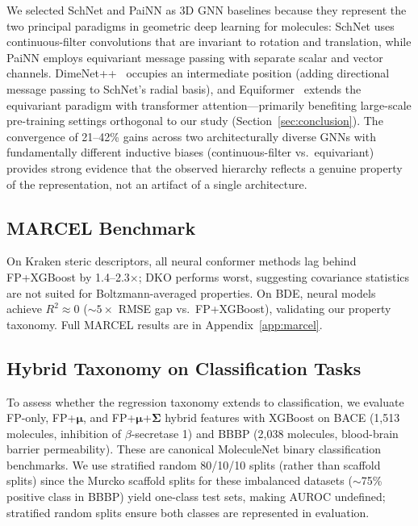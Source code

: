 \documentclass[sigconf]{acmart}
\newcommand{\rev}[1]{#1}
\begin{document}
\rev{We selected SchNet and PaiNN as 3D GNN baselines because they represent the two principal paradigms in geometric deep learning for molecules: SchNet uses continuous-filter convolutions that are invariant to rotation and translation, while PaiNN employs equivariant message passing with separate scalar and vector channels. DimeNet++~\cite{gasteiger2021dimenetpp} occupies an intermediate position (adding directional message passing to SchNet's radial basis), and Equiformer~\cite{liao2023equiformer} extends the equivariant paradigm with transformer attention---primarily benefiting large-scale pre-training settings orthogonal to our study (Section~\ref{sec:conclusion}). The convergence of 21--42\% gains across two architecturally diverse GNNs with fundamentally different inductive biases (continuous-filter vs.\ equivariant) provides strong evidence that the observed hierarchy reflects a genuine property of the representation, not an artifact of a single architecture.}

\subsection{MARCEL Benchmark}
\label{sec:marcel}

On Kraken steric descriptors, all neural conformer methods lag behind FP+XGBoost by 1.4--2.3$\times$; DKO performs worst, suggesting covariance statistics are not suited for Boltzmann-averaged properties. On BDE, neural models achieve $R^2 \approx 0$ (${\sim}5\times$ RMSE gap vs.\ FP+XGBoost), validating our property taxonomy. Full MARCEL results are in Appendix~\ref{app:marcel}.

\FloatBarrier
\subsection{\rev{Hybrid Taxonomy on Classification Tasks}}
\label{sec:classification}

\rev{To assess whether the regression taxonomy extends to classification, we evaluate FP-only, FP+$\boldsymbol{\mu}$, and FP+$\boldsymbol{\mu}$+$\boldsymbol{\Sigma}$ hybrid features with XGBoost on BACE (1,513 molecules, inhibition of $\beta$-secretase 1) and BBBP (2,038 molecules, blood-brain barrier permeability). These are canonical MoleculeNet binary classification benchmarks. We use stratified random 80/10/10 splits (rather than scaffold splits) since the Murcko scaffold splits for these imbalanced datasets ($\sim$75\% positive class in BBBP) yield one-class test sets, making AUROC undefined; stratified random splits ensure both classes are represented in evaluation.}
\end{document}
